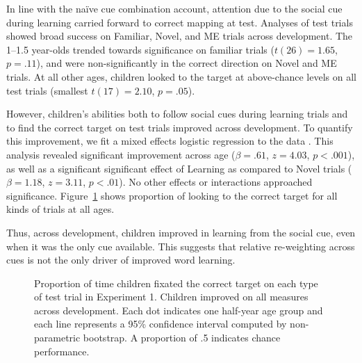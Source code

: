 \documentclass[man,floatsintext]{apa6}
\begin{document}
In line with the na\"i{v}e cue combination account, attention due to the social cue during learning carried forward to correct mapping at test. Analyses of test trials showed broad success on Familiar, Novel, and ME trials across development. The 1--1.5 year-olds trended towards significance on familiar trials ($t(26)  = 1.65$, $p = .11$), and were non-significantly in the correct direction on Novel and ME trials. At all other ages, children looked to the target at above-chance levels on all test trials (smallest $t(17)  = 2.10$, $p = .05$). 

However, children's abilities both to follow social cues during learning trials and to find the correct target on test trials improved across development. To quantify this improvement, we fit a mixed effects logistic regression to the data \cite{Jaeger2008}. This analysis revealed significant improvement across age ($\beta = .61$, $z = 4.03$, $p <.001$), as well as a significant significant effect of Learning as compared to Novel trials ($\beta = 1.18$, $z = 3.11$, $p <.01$). No other effects or interactions approached significance. Figure~\ref{fig:exp1_train_test} shows proportion of looking to the correct target for all kinds of trials at all ages. 

Thus, across development, children improved in learning from the social cue, even when it was the only cue available. This suggests that relative re-weighting across cues is not the only driver of improved word learning.

\begin{figure}[tb]
	\caption{\label{fig:exp1_train_test} Proportion of time children fixated the correct target on each type of test trial in Experiment 1. Children improved on all measures across development. Each dot indicates one half-year age group and each line represents a 95\% confidence interval computed by non-parametric bootstrap. A proportion of .5 indicates chance performance.}
\end{figure}	
\end{document}
